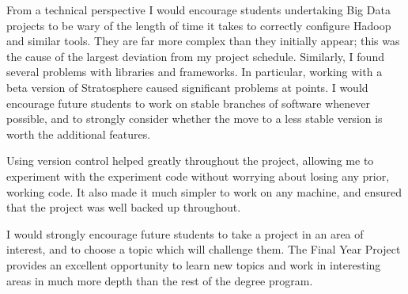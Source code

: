 From a technical perspective I would encourage students undertaking Big Data projects to be wary of the length of time it takes to correctly configure Hadoop and similar tools. They are far more complex than they initially appear; this was the cause of the largest deviation from my project schedule. Similarly, I found several problems with libraries and frameworks. In particular, working with a beta version of Stratosphere caused significant problems at points. I would encourage future students to work on stable branches of software whenever possible, and to strongly consider whether the move to a less stable version is worth the additional features.

Using version control helped greatly throughout the project, allowing me to experiment with the experiment code without worrying about losing any prior, working code. It also made it much simpler to work on any machine, and ensured that the project was well backed up throughout. 

I would strongly encourage future students to take a project in an area of interest, and to choose a topic which will challenge them. The Final Year Project provides an excellent opportunity to learn new topics and work in interesting areas in much more depth than the rest of the degree program.
